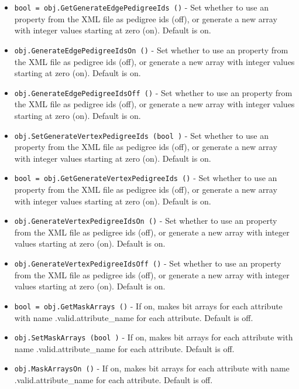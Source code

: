 \begin{itemize}
\item  \verb|bool = obj.GetGenerateEdgePedigreeIds ()| -  Set whether to use an property from the XML file as pedigree ids (off),
 or generate a new array with integer values starting at zero (on).
 Default is on.

\item  \verb|obj.GenerateEdgePedigreeIdsOn ()| -  Set whether to use an property from the XML file as pedigree ids (off),
 or generate a new array with integer values starting at zero (on).
 Default is on.

\item  \verb|obj.GenerateEdgePedigreeIdsOff ()| -  Set whether to use an property from the XML file as pedigree ids (off),
 or generate a new array with integer values starting at zero (on).
 Default is on.

\item  \verb|obj.SetGenerateVertexPedigreeIds (bool )| -  Set whether to use an property from the XML file as pedigree ids (off),
 or generate a new array with integer values starting at zero (on).
 Default is on.

\item  \verb|bool = obj.GetGenerateVertexPedigreeIds ()| -  Set whether to use an property from the XML file as pedigree ids (off),
 or generate a new array with integer values starting at zero (on).
 Default is on.

\item  \verb|obj.GenerateVertexPedigreeIdsOn ()| -  Set whether to use an property from the XML file as pedigree ids (off),
 or generate a new array with integer values starting at zero (on).
 Default is on.

\item  \verb|obj.GenerateVertexPedigreeIdsOff ()| -  Set whether to use an property from the XML file as pedigree ids (off),
 or generate a new array with integer values starting at zero (on).
 Default is on.

\item  \verb|bool = obj.GetMaskArrays ()| -  If on, makes bit arrays for each attribute with name .valid.attribute\_name
 for each attribute.  Default is off.

\item  \verb|obj.SetMaskArrays (bool )| -  If on, makes bit arrays for each attribute with name .valid.attribute\_name
 for each attribute.  Default is off.

\item  \verb|obj.MaskArraysOn ()| -  If on, makes bit arrays for each attribute with name .valid.attribute\_name
 for each attribute.  Default is off.


\end{itemize}
